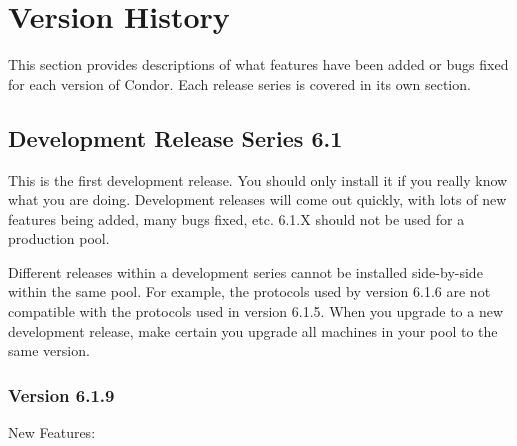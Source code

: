 \section{\label{sec:Version-History}Version History}

This section provides descriptions of what features have been added or
bugs fixed for each version of Condor.  
Each release series is covered in its own section.

\subsection{\label{sec:History-6-1}Development Release Series 6.1}

This is the first development release.
You should only install it if you really know what you are doing.
Development releases will come out quickly, with lots of new features
being added, many bugs fixed, etc.  
6.1.X should not be used for a production pool.

\Note Different releases within a development series cannot be
installed side-by-side within the same pool. 
For example, the protocols used by version 6.1.6 are not compatible with the
protocols used in version 6.1.5.  
When you upgrade to a new development release, make certain you upgrade all
machines in your pool to the same version.

\subsubsection{\label{sec:New-6-1-9}Version 6.1.9}

\noindent New Features:

